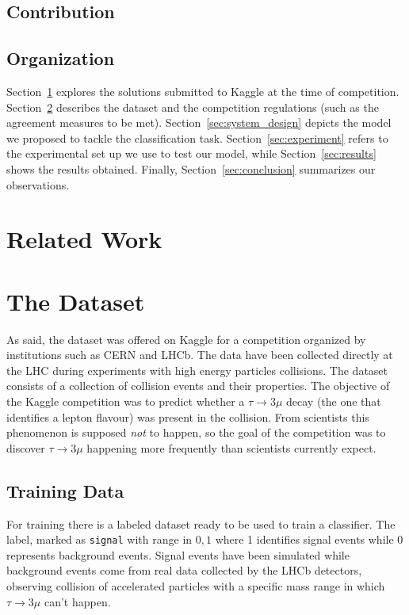 \documentclass[conference]{IEEEtran}
\begin{document}
\subsection{Contribution}


\subsection{Organization}
Section~\ref{sec:related_work} explores the solutions submitted to Kaggle at the
time of competition. Section~\ref{sec:dataset} describes the dataset and the
competition regulations (such as the agreement measures to be met).
Section~\ref{sec:system_design} depicts the model we proposed to tackle the
classification task. Section~\ref{sec:experiment} refers to the experimental set
up we use to test our model, while Section~\ref{sec:results} shows the results
obtained. Finally, Section~\ref{sec:conclusion} summarizes our observations.


\section{Related Work}
\label{sec:related_work}



\section{The Dataset}
\label{sec:dataset}
As said, the dataset was offered on Kaggle for a competition organized by
institutions such as CERN and LHCb. The data have been collected directly at the
LHC during experiments with high energy particles collisions. The dataset
consists of a collection of collision events and their properties. The objective
of the Kaggle competition was to predict whether a $\tau \rightarrow 3\mu$ decay
(the one that identifies a lepton flavour) was present in the collision. From
scientists this phenomenon is supposed \emph{not} to happen, so the goal of the
competition was to discover $\tau \rightarrow 3\mu$ happening more frequently
than scientists currently expect.

\subsection{Training Data}
For training there is a labeled dataset ready to be used to train a classifier.
The label, marked as \texttt{signal} with range in ${0,1}$ where 1 identifies
signal events while 0 represents background events. Signal events have been
simulated while background events come from real data collected by the LHCb
detectors, observing collision of accelerated particles with a specific mass
range in which $\tau \rightarrow 3\mu$ can't happen.
\end{document}
